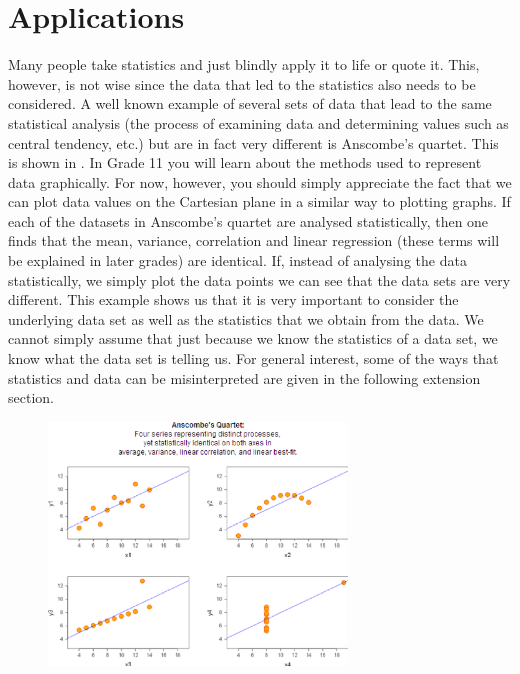 \begin{description}[noitemsep]
\begin{description}[noitemsep]
\par 
    \label{m39404*eip-443}
            \section{ Applications}
            \nopagebreak
            \label{m39404*eip-493}Many people take statistics and just blindly apply it to life or quote it. This, however, is not wise since the data that led to the statistics also needs to be considered. A well known example of several sets of data that lead to the same statistical analysis (the process of examining data and determining values such as central tendency, etc.) but are in fact very different is Anscombe's quartet. This is shown in . In Grade 11 you will learn about the methods used to represent data graphically. For now, however, you should simply appreciate the fact that we can plot data values on the Cartesian plane in a similar way to plotting graphs. If each of the datasets in Anscombe's quartet are analysed statistically, then one finds that the mean, variance, correlation and linear regression (these terms will be explained in later grades) are identical. If, instead of analysing the data statistically, we simply plot the data points we can see that the data sets are very different. This example shows us that it is very important to consider the underlying data set as well as the statistics that we obtain from the data. We cannot simply assume that just because we know the statistics of a data set, we know what the data set is telling us. For general interest, some of the ways that statistics and data can be misinterpreted are given in the following extension section.   
    \setcounter{subfigure}{0}
	\begin{figure}[H] %
    \begin{center}
    \label{m39404*uid3453!!!underscore!!!media}\label{m39404*uid3453!!!underscore!!!printimage}\includegraphics[width=300px]{col11306.imgs/m39404_anscombe.png} %

\end{center}
\end{figure}
\end{description}
\end{description}
